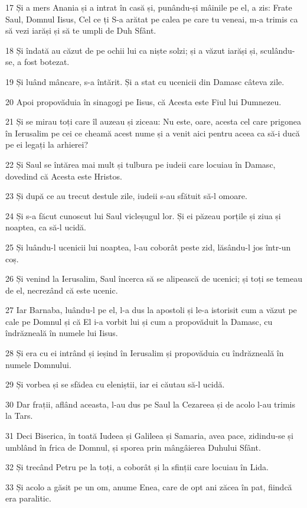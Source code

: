 \par 17 Și a mers Anania și a intrat în casă și, punându-și mâinile pe el, a zis: Frate Saul, Domnul Iisus, Cel ce ți S-a arătat pe calea pe care tu veneai, m-a trimis ca să vezi iarăși și să te umpli de Duh Sfânt.
\par 18 Și îndată au căzut de pe ochii lui ca niște solzi; și a văzut iarăși și, sculându-se, a fost botezat.
\par 19 Și luând mâncare, s-a întărit. Și a stat cu ucenicii din Damasc câteva zile.
\par 20 Apoi propovăduia în sinagogi pe Iisus, că Acesta este Fiul lui Dumnezeu.
\par 21 Și se mirau toți care îl auzeau și ziceau: Nu este, oare, acesta cel care prigonea în Ierusalim pe cei ce cheamă acest nume și a venit aici pentru aceea ca să-i ducă pe ei legați la arhierei?
\par 22 Și Saul se întărea mai mult și tulbura pe iudeii care locuiau în Damasc, dovedind că Acesta este Hristos.
\par 23 Și după ce au trecut destule zile, iudeii s-au sfătuit să-l omoare.
\par 24 Și s-a făcut cunoscut lui Saul vicleșugul lor. Și ei păzeau porțile și ziua și noaptea, ca să-l ucidă.
\par 25 Și luându-l ucenicii lui noaptea, l-au coborât peste zid, lăsându-l jos într-un coș.
\par 26 Și venind la Ierusalim, Saul încerca să se alipească de ucenici; și toți se temeau de el, necrezând că este ucenic.
\par 27 Iar Barnaba, luându-l pe el, l-a dus la apostoli și le-a istorisit cum a văzut pe cale pe Domnul și că El i-a vorbit lui și cum a propovăduit la Damasc, cu îndrăzneală în numele lui Iisus.
\par 28 Și era cu ei intrând și ieșind în Ierusalim și propovăduia cu îndrăzneală în numele Domnului.
\par 29 Și vorbea și se sfădea cu eleniștii, iar ei căutau să-l ucidă.
\par 30 Dar frații, aflând aceasta, l-au dus pe Saul la Cezareea și de acolo l-au trimis la Tars.
\par 31 Deci Biserica, în toată Iudeea și Galileea și Samaria, avea pace, zidindu-se și umblând în frica de Domnul, și sporea prin mângâierea Duhului Sfânt.
\par 32 Și trecând Petru pe la toți, a coborât și la sfinții care locuiau în Lida.
\par 33 Și acolo a găsit pe un om, anume Enea, care de opt ani zăcea în pat, fiindcă era paralitic.
